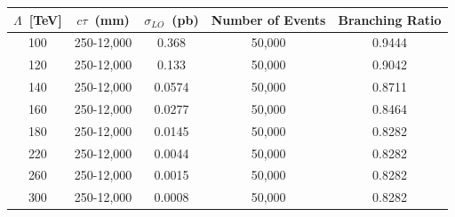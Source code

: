 \vspace{5mm}
\begin{minipage}{0.90\linewidth} 
\begin{center}
\centering
\begin{tabular}{c c c c c}
       \toprule
        \hline
        $\Lambda$~[TeV] & $c\tau$~(mm) & $\sigma_{LO}$~(pb) & \bfseries{Number of Events} & \bfseries{Branching Ratio}\\
       \hline
       \toprule
       100 & 250-12,000  & 0.368  & 50,000 & 0.9444\\
       120 & 250-12,000  & 0.133  & 50,000 & 0.9042\\
       140 & 250-12,000  & 0.0574 & 50,000 & 0.8711\\
       160 & 250-12,000  & 0.0277 & 50,000 & 0.8464\\
       180 & 250-12,000  & 0.0145 & 50,000 & 0.8282\\
       220 & 250-12,000  & 0.0044 & 50,000 & 0.8282\\
       260 & 250-12,000  & 0.0015 & 50,000 & 0.8282\\
       300 & 250-12,000  & 0.0008 & 50,000 & 0.8282\\
       \hline
       \bottomrule
       \end{tabular}  
\label{tab:mc_GMSB_sample}
\end{center}
\end{minipage}

